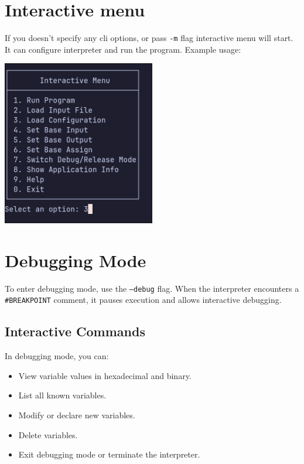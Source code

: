 \documentclass[a4paper,12pt]{article}
\begin{document}
\newpage


\section{Interactive menu}
If you doesn't specify any cli options, or pass \texttt{-m} flag interactive menu will start. It can configure interpreter and run the program. Example usage: \\

\begin{center}
	\includegraphics[width=0.5\textwidth]{assets/menu.png}
\end{center}


\section{Debugging Mode}
To enter debugging mode, use the \texttt{--debug} flag. When the interpreter encounters a \texttt{\#BREAKPOINT} comment, it pauses execution and allows interactive debugging.


\subsection{Interactive Commands}
In debugging mode, you can:
\begin{itemize}
	\item View variable values in hexadecimal and binary.
	\item List all known variables.
	\item Modify or declare new variables.
	\item Delete variables.
	\item Exit debugging mode or terminate the interpreter.
\end{itemize}

\newpage
\end{document}
